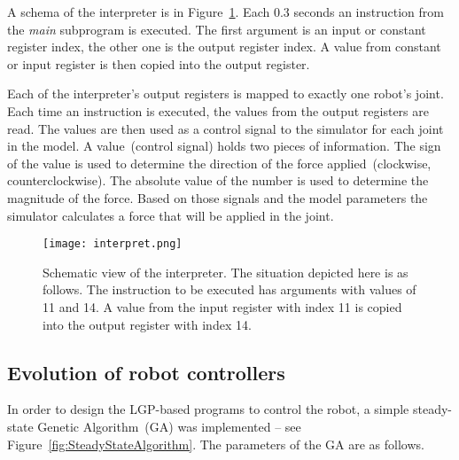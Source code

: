 \documentclass{ExcelAtFIT}
\begin{document}
A schema of the interpreter is in Figure~\ref{fig:Interpret}.
Each 0.3 seconds an instruction from the \textit{main} subprogram is executed.
The first argument is an input or constant register index, the other one is the output register index.
A value from constant or input register is then copied into the output register.

Each of the interpreter's output registers is mapped to exactly one robot's joint.
Each time an instruction is executed, the values from the output registers are read.
The values are then used as a control signal to the simulator for each joint in the model.
A value~(control signal) holds two pieces of information.
The sign of the value is used to determine the direction of the force applied~(clockwise, counterclockwise).
The absolute value of the number is used to determine the magnitude of the force.
Based on those signals and the model parameters the simulator calculates a force that will be applied in the joint.

\begin{figure}[h]
	\centering
	{\texttt{[image: interpret.png]}}
	\caption{
	Schematic view of the interpreter.
	The situation depicted here is as follows.
	The instruction to be executed has arguments with values of 11 and 14.
	A value from the input register with index 11 is copied into the output register with index 14.
	}
	\label{fig:Interpret}
\end{figure}



\subsection{Evolution of robot controllers}
\label{sec:EvolutionOfRobotControllers}
In order to design the LGP-based programs to control the robot, a simple steady-state Genetic Algorithm~(GA) was implemented -- see Figure~\ref{fig:SteadyStateAlgorithm}.
The parameters of the GA are as follows.
\end{document}
